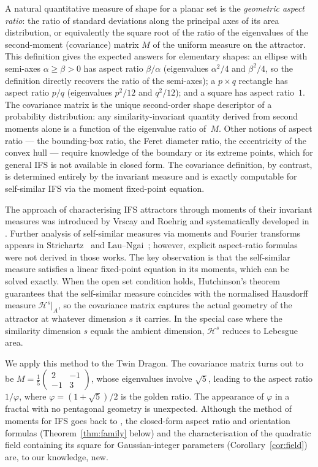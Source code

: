 \documentclass{amsart}
\theoremstyle{definition}
\theoremstyle{remark}
\begin{document}
A natural quantitative measure of shape for a planar set is the \emph{geometric aspect
ratio}: the ratio of standard deviations along the principal axes of its area
distribution, or equivalently the square root of the ratio of the eigenvalues of the
second-moment (covariance) matrix $M$ of the uniform measure on the attractor.
This definition gives the expected answers for elementary shapes:
an ellipse with semi-axes $\alpha \geq \beta > 0$ has aspect ratio $\beta/\alpha$
(eigenvalues $\alpha^2/4$ and $\beta^2/4$, so the definition directly recovers the
ratio of the semi-axes); a $p \times q$ rectangle has aspect ratio $p/q$
(eigenvalues $p^2/12$ and $q^2/12$); and a square has aspect ratio~$1$.
The covariance matrix is the unique second-order shape descriptor of a
probability distribution: any similarity-invariant quantity derived
from second moments alone is a function of the eigenvalue ratio of~$M$.
Other notions of aspect ratio --- the bounding-box ratio, the Feret
diameter ratio, the eccentricity of the convex hull --- require
knowledge of the boundary or its extreme points,
which for general IFS is not available in closed form.
The covariance definition, by contrast, is determined entirely by the
invariant measure and is exactly computable for self-similar IFS via
the moment fixed-point equation.

The approach of characterising IFS attractors through moments of their invariant
measures was introduced by Vrscay and Roehrig \cite{VrscayRoehrig1989} and
systematically developed in \cite{Vrscay1991}.
Further analysis of self-similar measures via moments and Fourier transforms
appears in Strichartz~\cite{Strichartz1993} and Lau--Ngai~\cite{LauNgai1999};
however, explicit aspect-ratio formulas were not derived in those works.
The key observation is that the
self-similar measure satisfies a linear fixed-point equation in its moments, which
can be solved exactly.  When the open set condition holds, Hutchinson's theorem
\cite{Hutchinson1981} guarantees that the self-similar measure coincides with the
normalised Hausdorff measure $\mathcal{H}^s|_A$, so the covariance matrix captures
the actual geometry of the attractor at whatever dimension $s$ it carries.  In the
special case where the similarity dimension $s$ equals the ambient dimension,
$\mathcal{H}^s$ reduces to Lebesgue area.

We apply this method to the Twin Dragon.  The covariance matrix turns out to be
$M = \tfrac{1}{5}\begin{pmatrix}2&-1\\-1&3\end{pmatrix}$,
whose eigenvalues involve $\sqrt{5}$, leading to the aspect ratio $1/\varphi$,
where $\varphi = (1+\sqrt{5})/2$ is the golden ratio.  The appearance of $\varphi$
in a fractal with no pentagonal geometry is unexpected.
Although the method of moments for IFS goes back to \cite{VrscayRoehrig1989},
the closed-form aspect ratio and orientation formulas
(Theorem~\ref{thm:family} below) and the
characterisation of the quadratic field containing its square for Gaussian-integer parameters
(Corollary~\ref{cor:field}) are, to our knowledge, new.
\end{document}
